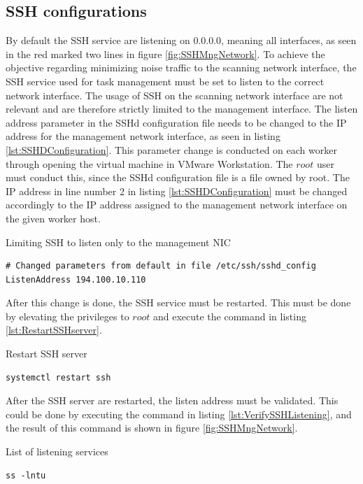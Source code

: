 \subsection{SSH configurations}
\label{ss:SSHConfiguration}
By default the SSH service are listening on $0.0.0.0$, meaning all interfaces, as seen in the red marked two lines in figure \ref{fig:SSHMngNetwork}.
To achieve the objective regarding minimizing noise traffic to the scanning network interface, the SSH service used for task management must be set to listen to the correct network interface. The usage of SSH on the scanning network interface are not relevant and are therefore strictly limited to the management interface.
The listen address parameter in the SSHd configuration file needs to be changed to the IP address for the management network interface, as seen in listing \ref{lst:SSHDConfiguration}. This parameter change is conducted on each worker through opening the virtual machine in VMware Workstation. The $root$ user must conduct this, since the SSHd configuration file is a file owned by root.
The IP address in line number 2 in listing \ref{lst:SSHDConfiguration} must be changed accordingly to the IP address assigned to the management network interface on the given worker host.

\begin{listing}[!ht]
\caption{Limiting SSH to listen only to the management NIC}
\label{lst:SSHDConfiguration}
\begin{verbatim}
# Changed parameters from default in file /etc/ssh/sshd_config
ListenAddress 194.100.10.110
\end{verbatim}
\end{listing}

After this change is done, the SSH service must be restarted.
This must be done by elevating the privileges to $root$ and execute the command in listing \ref{lst:RestartSSHserver}.

\begin{listing}[!ht]
\caption{Restart SSH server}
\label{lst:RestartSSHserver}
\begin{verbatim}
systemctl restart ssh
\end{verbatim}
\end{listing}

After the SSH server are restarted, the listen address must be validated.
This could be done by executing the command in listing \ref{lst:VerifySSHListening}, and the result of this command is shown in figure \ref{fig:SSHMngNetwork}.
\begin{listing}[!ht]
\caption{List of listening services}
\label{lst:VerifySSHListening}
\begin{verbatim}
ss -lntu
\end{verbatim}
\end{listing}

